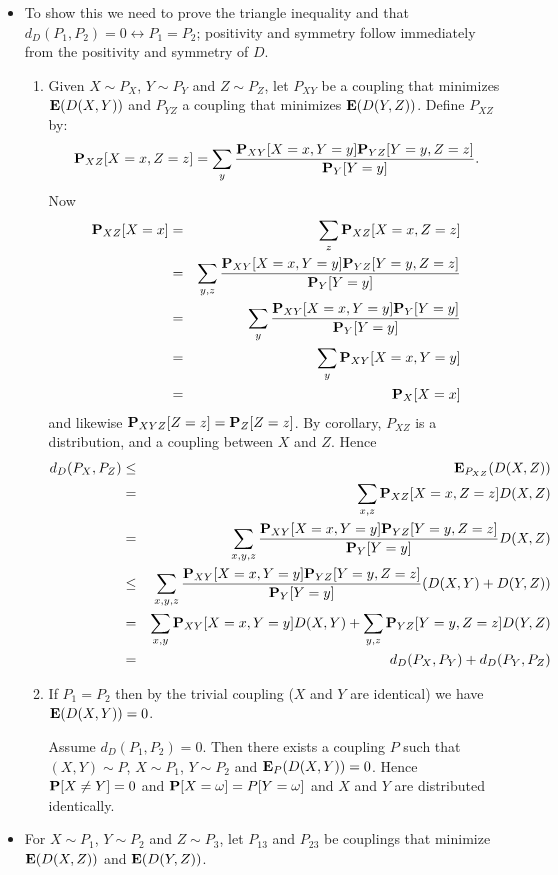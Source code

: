 \documentclass[11pt]{article} \usepackage{amssymb}
\newcommand{\E}{{\bf E}} \newcommand{\Cov}{{\bf Cov}}
\begin{document}
\begin{itemize}
\item To show this we need to prove the triangle inequality and that
  $d_D(P_1,P_2)=0 \leftrightarrow P_1=P_2$; positivity and symmetry follow immediately from
  the positivity and symmetry of $D$.
  \begin{enumerate}
  \item Given $X\sim P_X$, $Y\sim P_Y$ and $Z\sim P_Z$, let $P_{XY}$ be
    a coupling that minimizes $\E(D(X,Y))$ and $P_{YZ}$ a coupling that
    minimizes $\E(D(Y,Z))$. Define $P_{XZ}$ by:
    $$\P_{XZ}[X=x,Z=z]=\sum_y{\P_{XY}[X=x,Y=y]\P_{YZ}[Y=y,Z=z]\over \P_Y[Y=y]}.$$ 
    Now 
    \begin{eqnarray*}
      \P_{XZ}[X=x]&=&\sum_z\P_{XZ}[X=x,Z=z]
      \\ &=& \sum_{y,z}{\P_{XY}[X=x,Y=y]\P_{YZ}[Y=y,Z=z]\over \P_Y[Y=y]}
      \\ &=& \sum_{y}{\P_{XY}[X=x,Y=y]\P_{Y}[Y=y]\over \P_Y[Y=y]}
      \\ &=& \sum_{y}\P_{XY}[X=x,Y=y]
      \\ &=& \P_X[X=x]
    \end{eqnarray*}
    and likewise $\P_{XYZ}[Z=z]=\P_Z[Z=z]$. By corollary, $P_{XZ}$ is a
    distribution, and a coupling between $X$ and $Z$. Hence 
    \begin{eqnarray*}
      d_D(P_X,P_Z)&\leq& \E_{P_{XZ}}(D(X,Z)) 
      \\ &=& \sum_{x,z}\P_{XZ}[X=x,Z=z]D(X,Z)
      \\ &=& \sum_{x,y,z}{\P_{XY}[X=x,Y=y]\P_{YZ}[Y=y,Z=z]\over \P_Y[Y=y]}D(X,Z)
      \\ &\leq&\sum_{x,y,z}{\P_{XY}[X=x,Y=y]\P_{YZ}[Y=y,Z=z]\over \P_Y[Y=y]}(D(X,Y)+D(Y,Z))
      \\ &=&\sum_{x,y}\P_{XY}[X=x,Y=y]D(X,Y)+\sum_{y,z}\P_{YZ}[Y=y,Z=z]D(Y,Z)
      \\ &=&d_D(P_X,P_Y)+d_D(P_Y,P_Z)
    \end{eqnarray*}
    
  \item If $P_1=P_2$ then by the trivial coupling ($X$ and $Y$ are identical)
    we have $\E(D(X,Y))=0$. 

    Assume $d_D(P_1,P_2)=0$. Then there exists a coupling $P$ such that  
    $(X,Y)\sim P$,
    $X\sim P_1$, $Y\sim P_2$ and $\E_P(D(X,Y))=0$. Hence $\P[X\neq Y]=0$ and
    $\P[X=\omega]=P[Y=\omega]$ and $X$ and $Y$ are distributed identically.
  \end{enumerate}
  \item 
    For  $X\sim P_1$, $Y\sim P_2$ and $Z\sim P_3$, let $P_{13}$ and $P_{23}$ 
    be couplings that minimize $\E(D(X,Z))$ and
    $\E(D(Y,Z))$.
    

\end{itemize}
\end{document}
